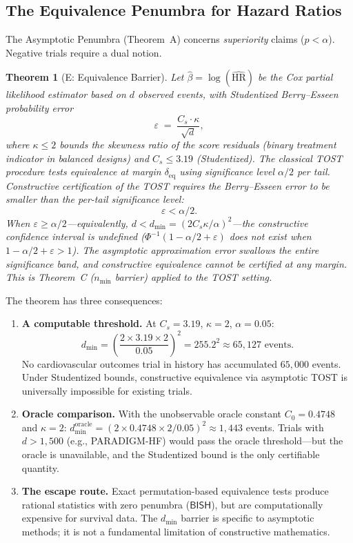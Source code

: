 \documentclass[11pt,a4paper]{article}
\theoremstyle{plain}
\newtheorem{theorem}{Theorem}[section]
\theoremstyle{definition}
\newcommand{\BISH}{\textsf{BISH}}
\renewcommand{\Phi}{\varPhi}
\begin{document}
\subsection{The Equivalence Penumbra for Hazard Ratios}

The Asymptotic Penumbra (Theorem~A) concerns \emph{superiority} claims ($p < \alpha$).  Negative trials require a dual notion.

\begin{theorem}[E: Equivalence Barrier]\label{thm:E}
Let $\hat\beta = \log(\widehat{\mathrm{HR}})$ be the Cox partial likelihood estimator based on $d$ observed events, with Studentized Berry--Esseen probability error
\[
  \varepsilon \;=\; \frac{C_s \cdot \kappa}{\sqrt{d}},
\]
where $\kappa \leq 2$ bounds the skewness ratio of the score residuals (binary treatment indicator in balanced designs) and $C_s \leq 3.19$ (Studentized).  The classical TOST procedure tests equivalence at margin $\delta_{\mathrm{eq}}$ using significance level $\alpha/2$ per tail.  Constructive certification of the TOST requires the Berry--Esseen error to be smaller than the per-tail significance level:
\[
  \varepsilon < \alpha/2.
\]
When $\varepsilon \geq \alpha/2$---equivalently, $d < d_{\min} = (2 C_s \kappa / \alpha)^2$---the constructive confidence interval is undefined ($\Phi^{-1}(1 - \alpha/2 + \varepsilon)$ does not exist when $1 - \alpha/2 + \varepsilon > 1$).  The asymptotic approximation error swallows the entire significance band, and constructive equivalence cannot be certified \emph{at any margin}.  This is Theorem~C ($n_{\min}$ barrier) applied to the TOST setting.
\end{theorem}

\noindent The theorem has three consequences:
\begin{enumerate}[nosep]
\item \textbf{A computable threshold.}  At $C_s = 3.19$, $\kappa = 2$, $\alpha = 0.05$:
\[
  d_{\min} = \left(\frac{2 \times 3.19 \times 2}{0.05}\right)^2 = 255.2^2 \approx 65{,}127 \text{ events}.
\]
No cardiovascular outcomes trial in history has accumulated $65{,}000$ events.  Under Studentized bounds, constructive equivalence via asymptotic TOST is universally impossible for existing trials.
\item \textbf{Oracle comparison.}  With the unobservable oracle constant $C_0 = 0.4748$ and $\kappa = 2$: $d_{\min}^{\mathrm{oracle}} = (2 \times 0.4748 \times 2/0.05)^2 \approx 1{,}443$ events.  Trials with $d > 1{,}500$ (e.g., PARADIGM-HF) would pass the oracle threshold---but the oracle is unavailable, and the Studentized bound is the only certifiable quantity.
\item \textbf{The escape route.}  Exact permutation-based equivalence tests produce rational statistics with zero penumbra ($\BISH$), but are computationally expensive for survival data.  The $d_{\min}$ barrier is specific to asymptotic methods; it is not a fundamental limitation of constructive mathematics.
\end{enumerate}
\end{document}

